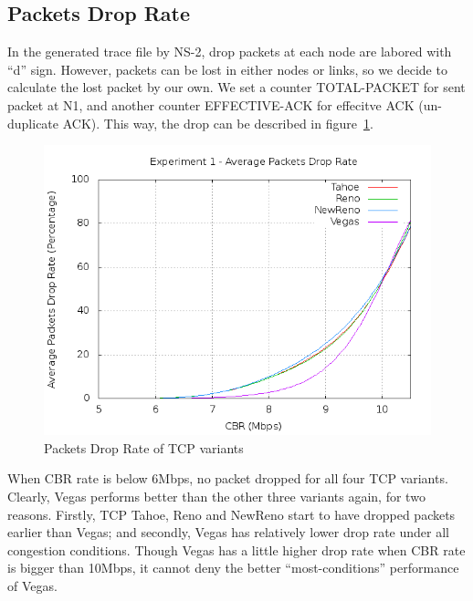 \documentclass[10pt, conference]{lib/IEEEtran}
\begin{document}
\subsection{Packets Drop Rate}
In the generated trace file by NS-2, drop packets at each node are 
labored with ``d'' sign. However, packets can be lost in either nodes 
or links, so we decide to calculate the lost packet by our own. We 
set a counter TOTAL-PACKET for sent packet at N1, and another counter 
EFFECTIVE-ACK for effecitve ACK (un-duplicate ACK). This way, the drop 
can be described in figure~\ref{fig:exp1_drop}.
\begin{figure}[!htb]
    \centering
    \includegraphics[width=0.9\linewidth]{plot/exp1-dr.png}
    \caption{Packets Drop Rate of TCP variants}
    \label{fig:exp1_drop}
\end{figure}
When CBR rate is below 6Mbps, no packet dropped for all four TCP 
variants. Clearly, Vegas performs better than the other three variants 
again, for two reasons. Firstly, TCP Tahoe, Reno and NewReno start to 
have dropped packets earlier than Vegas; and secondly, Vegas has 
relatively lower drop rate under all congestion conditions. Though 
Vegas has a little higher drop rate when CBR rate is bigger than 
10Mbps, it cannot deny the better ``most-conditions'' performance of 
Vegas.
\end{document}
